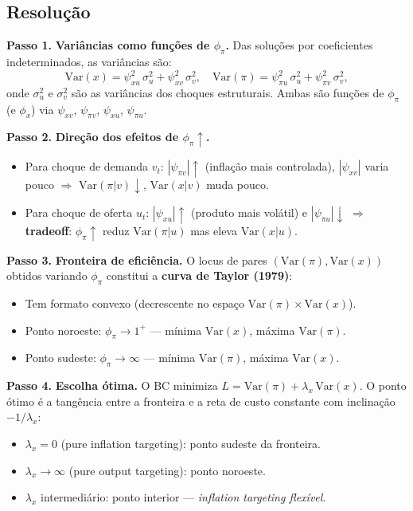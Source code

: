 \documentclass[12pt, a4paper]{article}
\begin{document}
\subsection*{Resolução}

\textbf{Passo 1.} \textbf{Variâncias como funções de $\phi_\pi$.}
Das soluções por coeficientes indeterminados, as variâncias são:
\[
\text{Var}(x) = \psi_{xu}^2\,\sigma_u^2 + \psi_{xv}^2\,\sigma_v^2,\quad
\text{Var}(\pi) = \psi_{\pi u}^2\,\sigma_u^2 + \psi_{\pi v}^2\,\sigma_v^2,
\]
onde $\sigma_u^2$ e $\sigma_v^2$ são as variâncias dos choques estruturais.
Ambas são funções de $\phi_\pi$ (e $\phi_x$) via $\psi_{xv}$, $\psi_{\pi v}$,
$\psi_{xu}$, $\psi_{\pi u}$.

\textbf{Passo 2.} \textbf{Direção dos efeitos de $\phi_\pi\uparrow$.}
\begin{itemize}[leftmargin=1.5em, itemsep=2pt]
  \item Para choque de demanda $v_t$: $|\psi_{\pi v}|\uparrow$ (inflação mais controlada),
        $|\psi_{xv}|$ varia pouco $\Rightarrow$ $\text{Var}(\pi|v)\downarrow$, $\text{Var}(x|v)$
        muda pouco.
  \item Para choque de oferta $u_t$: $|\psi_{xu}|\uparrow$ (produto mais volátil) e
        $|\psi_{\pi u}|\downarrow$ $\Rightarrow$ \textbf{tradeoff}: $\phi_\pi\uparrow$
        reduz $\text{Var}(\pi|u)$ mas eleva $\text{Var}(x|u)$.
\end{itemize}

\textbf{Passo 3.} \textbf{Fronteira de eficiência.}
O locus de pares $(\text{Var}(\pi), \text{Var}(x))$ obtidos variando $\phi_\pi$
constitui a \textbf{curva de Taylor (1979)}:
\begin{itemize}[leftmargin=1.5em, itemsep=2pt]
  \item Tem formato convexo (decrescente no espaço $\text{Var}(\pi)\times\text{Var}(x)$).
  \item Ponto noroeste: $\phi_\pi\to 1^+$ --- mínima $\text{Var}(x)$, máxima $\text{Var}(\pi)$.
  \item Ponto sudeste: $\phi_\pi\to\infty$ --- mínima $\text{Var}(\pi)$, máxima $\text{Var}(x)$.
\end{itemize}

\textbf{Passo 4.} \textbf{Escolha ótima.}
O BC minimiza $L = \text{Var}(\pi) + \lambda_x\,\text{Var}(x)$. O ponto ótimo
é a tangência entre a fronteira e a reta de custo constante com inclinação
$-1/\lambda_x$:
\begin{itemize}[leftmargin=1.5em, itemsep=2pt]
  \item $\lambda_x = 0$ (pure inflation targeting): ponto sudeste da fronteira.
  \item $\lambda_x\to\infty$ (pure output targeting): ponto noroeste.
  \item $\lambda_x$ intermediário: ponto interior --- \emph{inflation targeting flexível}.
\end{itemize}
\end{document}
